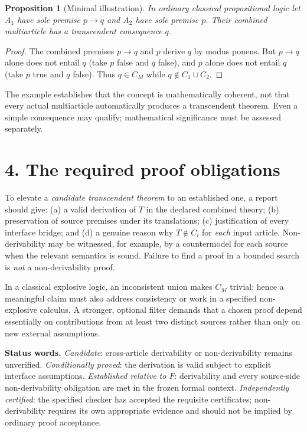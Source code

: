 \documentclass[10pt]{article}
\theoremstyle{simple}
\newtheorem{proposition}{Proposition}
\begin{document}
\begin{proposition}[Minimal illustration]
In ordinary classical propositional logic let $A_1$ have sole premise $p\to q$ and $A_2$ have sole premise $p$. Their combined multiarticle has a transcendent consequence $q$.
\end{proposition}
\begin{proof}
The combined premises $p\to q$ and $p$ derive $q$ by modus ponens. But $p\to q$ alone does not entail $q$ (take $p$ false and $q$ false), and $p$ alone does not entail $q$ (take $p$ true and $q$ false). Thus $q\in C_M$ while $q\notin C_1\cup C_2$.
\end{proof}

The example establishes that the concept is mathematically coherent, not that every actual multiarticle automatically produces a transcendent theorem. Even a simple consequence may qualify; mathematical significance must be assessed separately.

\section{4. The required proof obligations}
To elevate a \emph{candidate transcendent theorem} to an established one, a report should give: (a) a valid derivation of $T$ in the declared combined theory; (b) preservation of source premises under its translations; (c) justification of every interface bridge; and (d) a genuine reason why $T\notin C_i$ for \emph{each} input article. Non-derivability may be witnessed, for example, by a countermodel for each source when the relevant semantics is sound. Failure to find a proof in a bounded search is \emph{not} a non-derivability proof.

In a classical explosive logic, an inconsistent union makes $C_M$ trivial; hence a meaningful claim must also address consistency or work in a specified non-explosive calculus. A stronger, optional filter demands that a chosen proof depend essentially on contributions from at least two distinct sources rather than only on new external assumptions.

\noindent\textbf{Status words.} \emph{Candidate}: cross-article derivability or non-derivability remains unverified. \emph{Conditionally proved}: the derivation is valid subject to explicit interface assumptions. \emph{Established relative to $F$}: derivability and every source-side non-derivability obligation are met in the frozen formal context. \emph{Independently certified}: the specified checker has accepted the requisite certificates; non-derivability requires its own appropriate evidence and should not be implied by ordinary proof acceptance.
\end{document}
